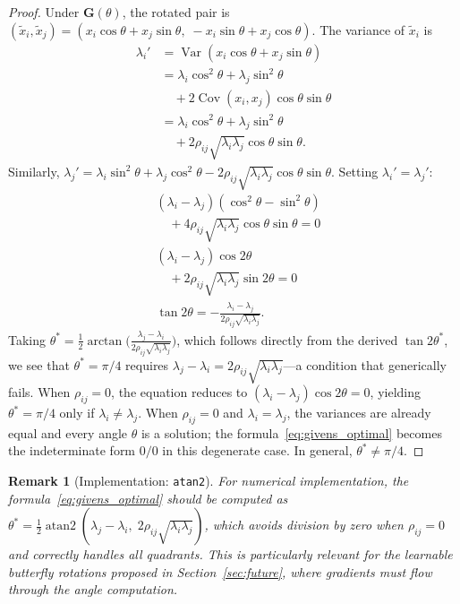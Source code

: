 \documentclass[11pt,a4paper]{article}
\newtheorem{remark}{Remark}
\DeclareMathOperator{\Var}{Var}
\DeclareMathOperator{\Cov}{Cov}
\newcommand{\bG}{\mathbf{G}}
\begin{document}
\begin{proof}
Under $\bG(\theta)$, the rotated pair is $(\tilde{x}_i, \tilde{x}_j) = (x_i\cos\theta + x_j\sin\theta, \; -x_i\sin\theta + x_j\cos\theta)$.
The variance of $\tilde{x}_i$ is
\begin{align*}
\lambda_i'
&= \Var(x_i\cos\theta + x_j\sin\theta) \\
&= \lambda_i\cos^2\theta + \lambda_j\sin^2\theta \\
&\quad + 2\Cov(x_i, x_j)\cos\theta\sin\theta \\
&= \lambda_i\cos^2\theta + \lambda_j\sin^2\theta \\
&\quad + 2\rho_{ij}\sqrt{\lambda_i\lambda_j}\cos\theta\sin\theta.
\end{align*}
Similarly,
$\lambda_j' = \lambda_i\sin^2\theta + \lambda_j\cos^2\theta
- 2\rho_{ij}\sqrt{\lambda_i\lambda_j}\cos\theta\sin\theta$.
Setting $\lambda_i' = \lambda_j'$:
\begin{align*}
&(\lambda_i - \lambda_j)(\cos^2\theta - \sin^2\theta) \\
&\quad + 4\rho_{ij}\sqrt{\lambda_i\lambda_j}\cos\theta\sin\theta = 0 \\
&(\lambda_i - \lambda_j)\cos 2\theta \\
&\quad + 2\rho_{ij}\sqrt{\lambda_i\lambda_j}\sin 2\theta = 0 \\
&\tan 2\theta = -\frac{\lambda_i - \lambda_j}{2\rho_{ij}\sqrt{\lambda_i\lambda_j}}.
\end{align*}
Taking $\theta^* = \frac{1}{2}\arctan\!\bigl(\frac{\lambda_j - \lambda_i}{2\rho_{ij}\sqrt{\lambda_i\lambda_j}}\bigr)$, which follows directly from the derived $\tan 2\theta^*$, we see that $\theta^* = \pi/4$ requires $\lambda_j - \lambda_i = 2\rho_{ij}\sqrt{\lambda_i\lambda_j}$---a condition that generically fails.
When $\rho_{ij} = 0$, the equation reduces to $(\lambda_i - \lambda_j)\cos 2\theta = 0$, yielding $\theta^* = \pi/4$ only if $\lambda_i \neq \lambda_j$.
When $\rho_{ij} = 0$ and $\lambda_i = \lambda_j$, the variances are already equal and every angle $\theta$ is a solution; the formula~\eqref{eq:givens_optimal} becomes the indeterminate form $0/0$ in this degenerate case.
In general, $\theta^* \neq \pi/4$.
\end{proof}

\begin{remark}[Implementation: \texttt{atan2}]
\label{rem:atan2}
For numerical implementation, the formula~\eqref{eq:givens_optimal} should be computed as $\theta^* = \frac{1}{2}\operatorname{atan2}(\lambda_j - \lambda_i, \; 2\rho_{ij}\sqrt{\lambda_i\lambda_j})$, which avoids division by zero when $\rho_{ij} = 0$ and correctly handles all quadrants.
This is particularly relevant for the learnable butterfly rotations proposed in Section~\ref{sec:future}, where gradients must flow through the angle computation.
\end{remark}
\end{document}

